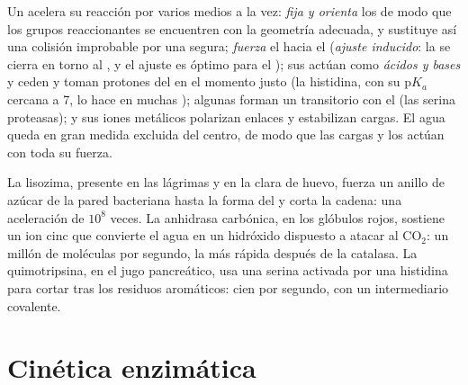 \begin{proposition}\label{prop:b1:enzymes:mechanisms}
Un  acelera su reacción por varios medios a la vez:
\emph{fija y orienta} los  de modo que los grupos reaccionantes se
encuentren con la geometría adecuada, y sustituye así una colisión
improbable por una segura; \emph{fuerza} el  hacia el  (\emph{ajuste inducido}: la  se
cierra en torno al , y el ajuste es óptimo para el ); sus  actúan como \emph{ácidos y bases} y
ceden y toman protones del  en el momento justo (la histidina, con
su p$K_a$ cercana a 7, lo hace en muchas ); algunas forman un
\emph{} transitorio con el  (las serina proteasas);
y sus iones metálicos polarizan enlaces y estabilizan cargas. El agua queda
en gran medida excluida del centro, de modo que las cargas y los  actúan con toda su fuerza.
\end{proposition}

\begin{example}\label{ex:b1:enzymes:three}
La lisozima, presente en las lágrimas y en la clara de huevo, fuerza un
anillo de azúcar de la pared bacteriana hasta la forma del  y corta la cadena: una aceleración de $10^8$ veces. La anhidrasa
carbónica, en los glóbulos rojos, sostiene un ion cinc que convierte el agua
en un hidróxido dispuesto a atacar al $\mathrm{CO_2}$: un millón de
moléculas por segundo, la  más rápida después de la catalasa. La
quimotripsina, en el jugo pancreático, usa una serina activada por una
histidina para cortar  tras los residuos aromáticos: cien por
segundo, con un intermediario covalente.
\end{example}

\section{Cinética enzimática}

